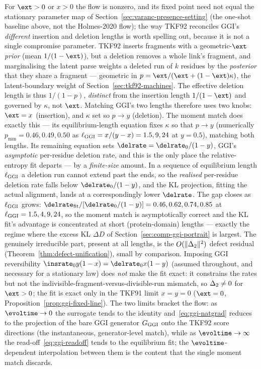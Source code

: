 \noindent For $\ext>0$ or $x>0$ the flow is nonzero, and its fixed point need
not equal the stationary parameter map of
Section~\ref{sec:varanc-presence-setting} (the one-shot baseline above, not the
Holmes-2020 flow); the way TKF92 reconciles GGI's
\emph{different} insertion and deletion lengths is worth spelling out, because
it is not a single compromise parameter.  TKF92 inserts fragments with a
geometric-$\ext$ \emph{prior} (mean $1/(1-\ext)$), but a deletion removes a whole
link's fragment, and marginalising the latent parse weights a deleted run of $k$
residues by the \emph{posterior} that they share a fragment --- geometric in
$p=\ext/(\ext+(1-\ext)\kappa)$, the latent-boundary weight of
Section~\ref{sec:tkf92-machines}.  The effective deletion length is thus
$1/(1-p)$, \emph{distinct} from the insertion length $1/(1-\ext)$ and governed by
$\kappa$, not $\ext$.  Matching GGI's two lengths therefore uses two knobs:
$\ext=x$ (insertion), and $\kappa$ set so $p\to y$ (deletion).  The moment match
does exactly this --- its equilibrium-length equation fixes $\kappa$ so that
$p\to y$ (numerically $p_{\mathrm{mm}}=0.46,0.49,0.50$ as
$\ell_{\mathrm{GGI}}=x/(y-x)=1.5,9,24$ at $y=0.5$), matching both lengths.  Its remaining
equation sets $\delrate=\delrate_0/(1-y)$, GGI's \emph{asymptotic} per-residue
deletion rate, and this is the only place the relative-entropy fit departs --- by
a \emph{finite-size} amount.  In a sequence of equilibrium length $\ell_{\mathrm{GGI}}$ a
deletion run cannot extend past the ends, so the \emph{realised} per-residue
deletion rate falls below $\delrate_0/(1-y)$, and the KL projection, fitting the
actual alignment, lands at a correspondingly lower $\delrate$.  The gap closes as
$\ell_{\mathrm{GGI}}$ grows: $\delrate_{\mathrm{fit}}/[\delrate_0/(1-y)]=0.46,0.62,0.74,0.85$
at $\ell_{\mathrm{GGI}}=1.5,4,9,24$, so the moment match is asymptotically correct and the
KL fit's advantage is concentrated at short (protein-domain) lengths --- exactly
the regime where the excess KL $\Delta D$ of
Section~\ref{sec:comp-ggi-portrait} is largest.  The genuinely irreducible part,
present at all lengths, is the $O(\|\Delta_2\|^2)$ defect residual
(Theorem~\ref{thm:defect-unification}), small by comparison.  Imposing GGI
reversibility $\insrate_0 y(1-x)=\delrate_0 x(1-y)$ (assumed throughout, and
necessary for a stationary law) does \emph{not} make the fit exact: it constrains
the rates but not the indivisible-fragment-versus-divisible-run mismatch, so
$\Delta_2\neq0$ for $\ext>0$; the fit is exact only in the TKF91 limit
$x=y=0$ ($\ext=0$, Proposition~\ref{prop:ggi-fixed-line}).  The two limits
bracket the flow: as
$\evoltime\to0$ the
surrogate tends to the identity and~\eqref{eq:ggi-natgrad} reduces to the
projection of the bare GGI generator $G_{\mathrm{GGI}}$ onto the TKF92 score directions
(the instantaneous, generator-level match), while as $\evoltime\to\infty$ the
read-off~\eqref{eq:ggi-readoff} tends to the equilibrium fit; the
$\evoltime$-dependent interpolation between them is the content that the single
moment match discards.

